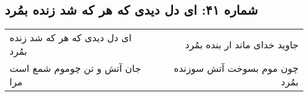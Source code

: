 \begin{center}
\section*{شماره ۴۱: ای دل دیدی که هر که شد زنده بمُرد}
\label{sec:041}
\begin{longtable}{l p{0.5cm} r}
ای دل دیدی که هر که شد زنده بمُرد
&&
جاوید خدای ماند ار بنده بمُرد
\\
جان آتش و تن چوموم شمع است مرا
&&
چون موم بسوخت آتش سوزنده بمُرد
\\
\end{longtable}
\end{center}
